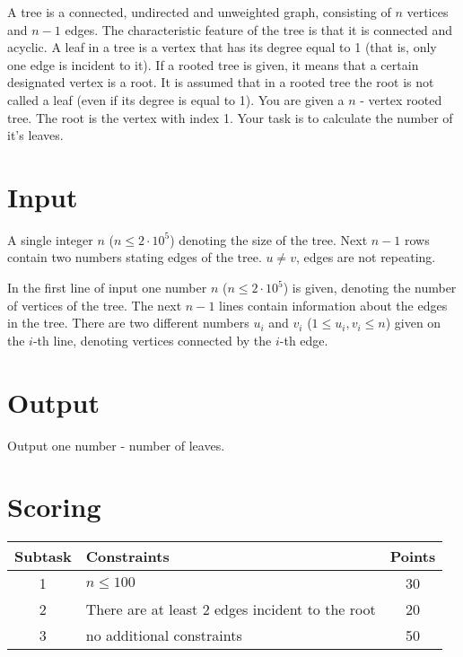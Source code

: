 \documentclass{spiral}
\begin{document}
    \makeheader

    A tree is a connected, undirected and unweighted graph,
    consisting of $n$ vertices and $n-1$ edges.
    The characteristic feature of the tree is that it is connected and acyclic.
    A leaf in a tree is a vertex that has its degree equal to 1
    (that is, only one edge is incident to it).
    If a rooted tree is given, it means that a certain designated vertex is a root.
    It is assumed that in a rooted tree the root is not called a leaf
    (even if its degree is equal to 1).
    You are given a $n$ - vertex rooted tree.
    The root is the vertex with index 1.
    Your task is to calculate the number of it's leaves.

\section{Input}

    A single integer $n$ ($n \leq 2 \cdot 10^5$) denoting the size of the tree.
    Next $n-1$ rows contain two numbers stating edges of the tree.
    $u \neq v$, edges are not repeating.

    In the first line of input one number $n$ ($n \leq 2 \cdot 10^5$) is given,
    denoting the number of vertices of the tree.
    The next $n-1$ lines contain information about the edges in the tree.
    There are two different numbers $u_i$ and $v_i$ ($1 \leq u_i, v_i \leq n$)
    given on the $i$-th line, denoting vertices connected by the $i$-th edge.

\section{Output}

    Output one number - number of leaves.


\section{Scoring}

    \begin{center}
        \begin{tabular}{|c|p{5cm}|c|}
            \hline
            \textbf{Subtask} & \textbf{Constraints} & \textbf{Points} \\
            \hline
            1 & $n \leq 100$ & 30 \\
            \hline
            2 & There are at least 2 edges incident to the root & 20 \\
            \hline
            3 & no additional constraints & 50 \\
            \hline
        \end{tabular}
    \end{center}
\end{document}
